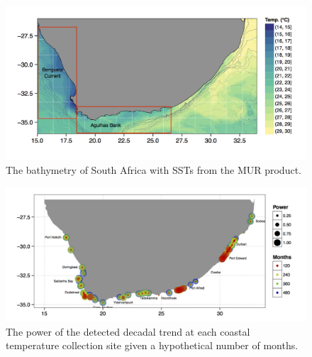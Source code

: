 \documentclass[]{book}
\theoremstyle{definition}
\theoremstyle{definition}
\theoremstyle{definition}
\theoremstyle{remark}
\begin{document}
\begin{figure}

{\centering \includegraphics[width=1\linewidth]{figures/MUR_bathy_plot_discrete_20090228} 

}

\caption{The bathymetry of South Africa with SSTs from the MUR product.}\label{fig:example10}
\end{figure}

\begin{figure}

{\centering \includegraphics[width=1\linewidth]{figures/sw-fig-7-1} 

}

\caption{The power of the detected decadal trend at each coastal temperature collection site given a hypothetical number of months.}\label{fig:example13}
\end{figure}
\end{document}
